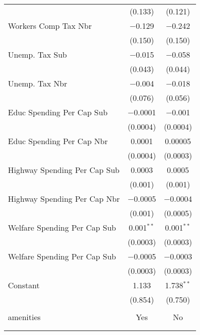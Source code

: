 \begin{table}[!htbp]
\begin{tabular}{@{\extracolsep{5pt}}lcc}
  & (0.133) & (0.121) \\ 
  Workers Comp Tax Nbr & $-$0.129 & $-$0.242 \\ 
  & (0.150) & (0.150) \\ 
  Unemp. Tax Sub & $-$0.015 & $-$0.058 \\ 
  & (0.043) & (0.044) \\ 
  Unemp. Tax Nbr & $-$0.004 & $-$0.018 \\ 
  & (0.076) & (0.056) \\ 
  Educ Spending Per Cap Sub & $-$0.0001 & $-$0.001 \\ 
  & (0.0004) & (0.0004) \\ 
  Educ Spending Per Cap Nbr & 0.0001 & 0.00005 \\ 
  & (0.0004) & (0.0003) \\ 
  Highway Spending Per Cap Sub & 0.0003 & 0.0005 \\ 
  & (0.001) & (0.001) \\ 
  Highway Spending Per Cap Nbr & $-$0.0005 & $-$0.0004 \\ 
  & (0.001) & (0.0005) \\ 
  Welfare Spending Per Cap Sub & 0.001$^{**}$ & 0.001$^{**}$ \\ 
  & (0.0003) & (0.0003) \\ 
  Welfare Spending Per Cap Sub & $-$0.0005 & $-$0.0003 \\ 
  & (0.0003) & (0.0003) \\ 
  Constant & 1.133 & 1.738$^{**}$ \\ 
  & (0.854) & (0.750) \\ 
 \hline \\[-1.8ex] 
amenities & Yes & No \\ 
\hline \\[-1.8ex] 
\hline 
\hline \\[-1.8ex] 
\end{tabular} 
\end{table} 
